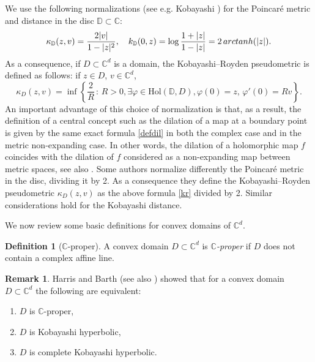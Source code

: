 \documentclass[11pt, reqno]{amsart}
\numberwithin{equation}{section}
\theoremstyle{definition}
\newtheorem{remark}[theorem]{Remark}
\newtheorem{definition}[theorem]{Definition}
\newcommand{\C}{\mathbb{C}}
\newcommand{\D}{\mathbb{D}}
\begin{document}
	
	We use the following normalizations (see e.g. Kobayashi \cite{kobayascione}) for the
	Poincar\'e metric and distance in the disc $\D\subset \C$:
	$$\kappa_\D(z,v)=\frac{2|v|}{1-|z|^2},\quad k_\D(0,z)=\log\frac{1+|z|}{1-|z|}= 2 \,{\rm arctanh}(|z|).$$
	As a consequence, if  $D\subset \C^d$ is a domain,  the Kobayashi--Royden 
	pseudometric is  defined as follows: if $z\in D$, $v\in \C^d$,
	\begin{equation}\label{kr} \kappa_D(z,v)=\inf \left\{\frac{2}{R}\,:\, R>0        , \exists \varphi\in \textrm{Hol}(\D,D), \varphi(0)=z,\, \varphi'(0)=Rv   \right\}.
	\end{equation}
	 An important  advantage of this  choice of normalization  is that, as a result, the definition of a central concept such as   the dilation of a map at a boundary point is given by the same exact formula \eqref{defdil} in both the complex case and in the metric non-expanding case. In other words, the dilation of a holomorphic map $f$ coincides with the dilation of $f$ considered  as a non-expanding map between metric spaces,  see also  \cite{AFGG,AFGK}.
	Some authors normalize differently the Poincar\'e metric  in the disc, dividing it by 2. As a consequence they define the  Kobayashi--Royden pseudometric $\kappa_D(z,v)$ as  the above formula \eqref{kr} divided by 2.  Similar considerations hold for the Kobayashi distance. 
	
	We now review some basic definitions for convex domains of $\C^d$.
	\begin{definition}[$\C$-proper]
		A convex domain  $D\subset \C^d$ is {\sl $\C$-proper} if $D$ does not contain a complex affine line. 
	\end{definition}
	\begin{remark}Harris \cite{Harris} and Barth \cite{Barth} (see also \cite{Bracci-Saracco}) showed that for a convex domain $D\subset \C^d$ the following are equivalent:
		\begin{enumerate}
			\item $D$ is $\C$-proper,
			\item $D$ is Kobayashi hyperbolic,
			\item $D$ is complete Kobayashi hyperbolic.
		\end{enumerate} 
	\end{remark}
	
\end{document}
